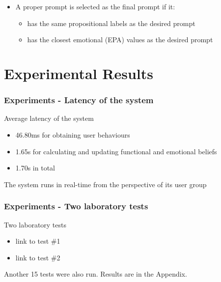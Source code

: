 \documentclass{beamer}
\begin{document}
\begin{frame}
\begin{itemize}
\begin{figure}[htb]
\begin{subfigure}[b]{.4\textwidth}
\end{subfigure}
\end{figure}
\item A proper prompt is selected as the final prompt if it:
\begin{itemize}
\item has the same propositional labels as the desired prompt
\item has the closest emotional (EPA) values as the desired prompt
\end{itemize}
\end{itemize}
\end{frame}

\section{Experimental Results}
\begin{frame}
\frametitle{Experiments - Latency of the system}
Average latency of the system
\begin{itemize} 
\item 46.80ms for obtaining user behaviours
\item 1.65s for calculating and updating functional and emotional beliefs
\item 1.70s in total
\end{itemize}
\vspace{.3cm}
The system runs in real-time from the perspective of its user group
\end{frame}

\begin{frame}
\frametitle{Experiments - Two laboratory tests}
Two laboratory tests
\begin{itemize}
\item link to test \#1
\item link to test \#2
\end{itemize}
\vspace{.3cm}
Another 15 tests were also run. Results are in the Appendix.
\end{frame}
\end{document}
